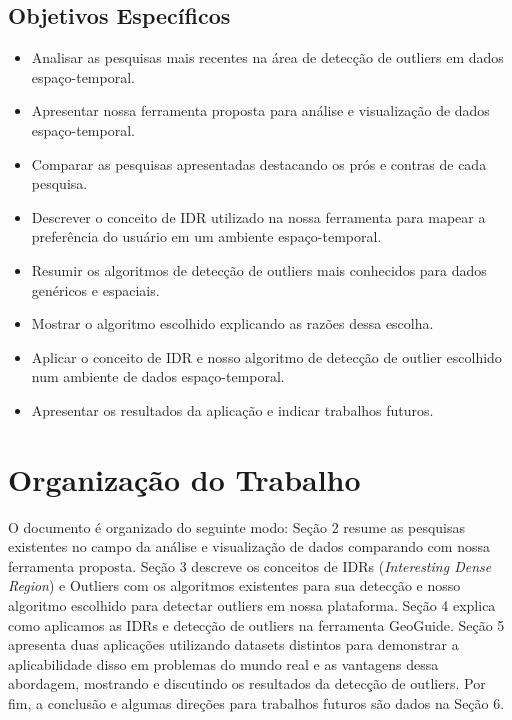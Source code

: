 \subsection{Objetivos Específicos}

\begin{itemize}
	\item
	      Analisar as pesquisas mais recentes na área de detecção de outliers em dados espaço-temporal.
	\item
	      Apresentar nossa ferramenta proposta para análise e visualização de dados espaço-temporal.
	\item
	      Comparar as pesquisas apresentadas destacando os prós e contras de cada pesquisa.
	\item
	      Descrever o conceito de IDR utilizado na nossa ferramenta para mapear a preferência do usuário em um ambiente espaço-temporal.
	\item
	      Resumir os algoritmos de detecção de outliers mais conhecidos para dados genéricos e espaciais.
	\item
	      Mostrar o algoritmo escolhido explicando as razões dessa escolha.
	\item
	      Aplicar o conceito de IDR e nosso algoritmo de detecção de outlier escolhido num ambiente de dados espaço-temporal.
	\item
	      Apresentar os resultados da aplicação e indicar trabalhos futuros.

\end{itemize}

\section{Organização do Trabalho}

O documento é organizado do seguinte modo: Seção 2 resume as pesquisas existentes no campo da análise e visualização de dados comparando com nossa ferramenta proposta. Seção 3 descreve os conceitos de IDRs (\textit{Interesting Dense Region}) e Outliers com os algoritmos existentes para sua detecção e nosso algoritmo escolhido para detectar outliers em nossa plataforma. Seção 4 explica como aplicamos as IDRs e detecção de outliers na ferramenta GeoGuide. Seção 5 apresenta duas aplicações utilizando datasets distintos para demonstrar a aplicabilidade disso em problemas do mundo real e as vantagens dessa abordagem, mostrando e discutindo os resultados da detecção de outliers. Por fim, a conclusão e algumas direções para trabalhos futuros são dados na Seção 6.